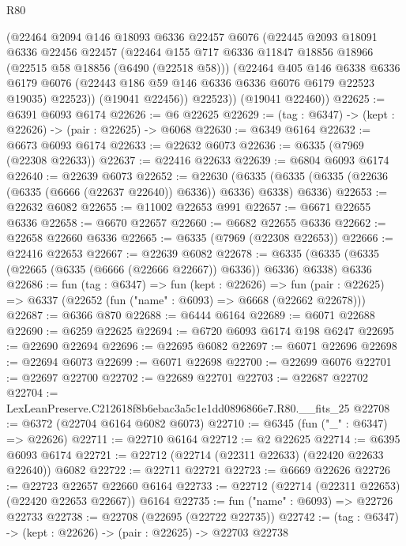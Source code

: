\begin{lexlean}{R80}
\begin{coremodule}
        (@22464
          @2094
          @146
          @18093
          @6336
          @22457
          @6076
          (@22445
            @2093
            @18091
            @6336
            @22456
            @22457
            (@22464
              @155
              @717
              @6336
              @11847
              @18856
              @18966
              (@22515 @58 @18856 (@6490 (@22518 @58)))
              (@22464
                @405
                @146
                @6338
                @6336
                @6179
                @6076
                (@22443 @186 @59 @146 @6336 @6336 @6076 @6179 @22523 @19035)
                @22523))
            (@19041 @22456))
          @22523))
      (@19041 @22460))
@22625 := @6391 @6093 @6174
@22626 := @6 @22625
@22629 := (tag : @6347) -> (kept : @22626) -> (pair : @22625) -> @6068
@22630 := @6349 @6164
@22632 := @6673 @6093 @6174
@22633 := @22632 @6073
@22636 := @6335 (@7969 (@22308 @22633))
@22637 := @22416 @22633
@22639 := @6804 @6093 @6174
@22640 := @22639 @6073
@22652 := @22630
    (@6335 (@6335 (@6335 (@22636 (@6335 (@6666 (@22637 @22640)) @6336)) @6336) @6338) @6336)
@22653 := @22632 @6082
@22655 := @11002 @22653 @991
@22657 := @6671 @22655 @6336
@22658 := @6670 @22657
@22660 := @6682 @22655 @6336
@22662 := @22658 @22660 @6336
@22665 := @6335 (@7969 (@22308 @22653))
@22666 := @22416 @22653
@22667 := @22639 @6082
@22678 := @6335 (@6335 (@6335 (@22665 (@6335 (@6666 (@22666 @22667)) @6336)) @6336) @6338) @6336
@22686 := fun (tag : @6347) =>
  fun (kept : @22626) =>
  fun (pair : @22625) => @6337 (@22652 (fun ("name" : @6093) => @6668 (@22662 @22678)))
@22687 := @6366 @870
@22688 := @6444 @6164
@22689 := @6071 @22688
@22690 := @6259 @22625
@22694 := @6720 @6093 @6174 @198 @6247
@22695 := @22690 @22694
@22696 := @22695 @6082
@22697 := @6071 @22696
@22698 := @22694 @6073
@22699 := @6071 @22698
@22700 := @22699 @6076
@22701 := @22697 @22700
@22702 := @22689 @22701
@22703 := @22687 @22702
@22704 := LexLeanPreserve.C212618f8b6ebac3a5c1e1dd0896866e7.R80.__fits_25
@22708 := @6372 (@22704 @6164 @6082 @6073)
@22710 := @6345 (fun ("_" : @6347) => @22626)
@22711 := @22710 @6164
@22712 := @2 @22625
@22714 := @6395 @6093 @6174
@22721 := @22712 (@22714 (@22311 @22633) (@22420 @22633 @22640)) @6082
@22722 := @22711 @22721
@22723 := @6669 @22626
@22726 := @22723 @22657 @22660 @6164
@22733 := @22712 (@22714 (@22311 @22653) (@22420 @22653 @22667)) @6164
@22735 := fun ("name" : @6093) => @22726 @22733
@22738 := @22708 (@22695 (@22722 @22735))
@22742 := (tag : @6347) -> (kept : @22626) -> (pair : @22625) -> @22703 @22738

\end{coremodule}
\end{lexlean}
